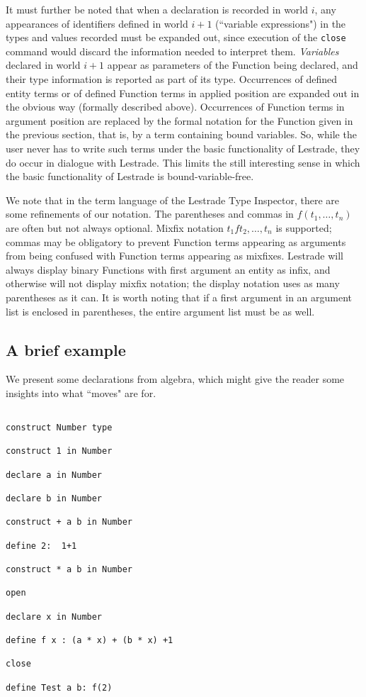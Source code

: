 \documentclass{article}
\begin{document}
It must further be noted that when a declaration is recorded in world $i$, any appearances of identifiers defined in world $i+1$ (``variable expressions") in the types and values recorded must be expanded out, since
execution of the {\tt close} command would discard the information needed to interpret them.  {\em Variables\/} declared in world $i+1$ appear as parameters of the Function being declared, and their type information is reported as part of its type.   Occurrences of defined entity terms or of defined Function terms in applied position are expanded out in the obvious way (formally described above).   Occurrences of Function terms in argument position are replaced by the formal notation for the Function given in the previous section, that is, by a term containing bound variables.  So, while the user never has to write such terms under the basic functionality of Lestrade, they do occur in dialogue with Lestrade.  This limits the still interesting sense in which the basic functionality of Lestrade is bound-variable-free.

We note that in the term language of the Lestrade Type Inspector, there are some refinements of our notation.  The parentheses and commas in $f(t_1,\ldots,t_n)$ are often but not always optional.  Mixfix notation $t_1 f t_2,\ldots,t_n$ is supported; commas may be obligatory to prevent Function terms appearing as arguments from being confused with Function terms appearing as mixfixes.  Lestrade will always display binary Functions with first argument an entity as infix, and otherwise will not display mixfix notation;  the display notation uses as many parentheses as it can.  It is worth noting that if a first argument in an argument list is enclosed in parentheses, the entire argument list must be as well.


\subsection{A brief example}

We present some declarations from algebra, which might give the reader some insights into what ``moves" are for.

\begin{verbatim}

construct Number type

construct 1 in Number

declare a in Number

declare b in Number

construct + a b in Number

define 2:  1+1

construct * a b in Number

open

declare x in Number

define f x : (a * x) + (b * x) +1

close

define Test a b: f(2)

\end{verbatim}
\end{document}
